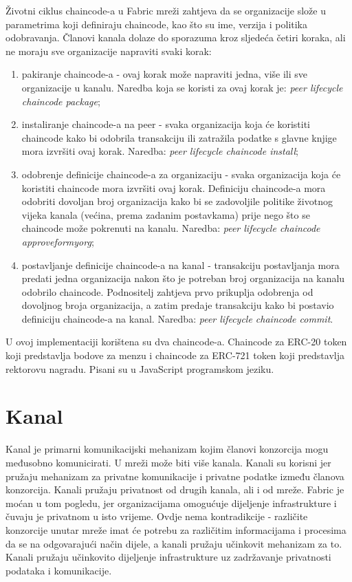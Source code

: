 \documentclass[times, utf8, diplomski]{fer}
\begin{document}
Životni ciklus chaincode-a u Fabric mreži zahtjeva da se organizacije slože u parametrima koji definiraju chaincode, kao što su ime, verzija i politika odobravanja.  Članovi kanala dolaze do sporazuma kroz sljedeća četiri koraka, ali ne moraju sve organizacije napraviti svaki korak:

\begin{enumerate}
\item pakiranje chaincode-a - ovaj korak može napraviti jedna,  više ili sve organizacije u kanalu.  Naredba koja se koristi za ovaj korak je: 
\textit{peer lifecycle chaincode package};

\item instaliranje chaincode-a na peer - svaka organizacija koja će koristiti chaincode kako bi odobrila transakciju ili zatražila podatke s glavne knjige mora izvršiti ovaj korak.  Naredba:
\textit{peer lifecycle chaincode install};

\item odobrenje definicije chaincode-a za organizaciju - svaka organizacija koja će koristiti chaincode mora izvršiti ovaj korak.  Definiciju chaincode-a mora odobriti dovoljan broj organizacija kako bi se zadovoljile politike životnog vijeka kanala (većina,  prema zadanim postavkama) prije nego što se chaincode može pokrenuti na kanalu.  Naredba:
\textit{peer lifecycle chaincode approveformyorg};

\item  postavljanje definicije chaincode-a na kanal - transakciju postavljanja mora predati jedna organizacija nakon što je potreban broj organizacija na kanalu odobrilo chaincode. Podnositelj zahtjeva prvo prikuplja odobrenja od dovoljnog broja organizacija,  a zatim predaje transakciju kako bi postavio definiciju chaincode-a na kanal. Naredba:
\textit{peer lifecycle chaincode commit}.
\end{enumerate}

U ovoj implementaciji korištena su dva chaincode-a. Chaincode za ERC-20 token koji predstavlja bodove za menzu i chaincode za ERC-721 token koji predstavlja rektorovu nagradu. Pisani su u JavaScript programskom jeziku.

\section{Kanal}

Kanal je primarni komunikacijski mehanizam kojim članovi konzorcija mogu međusobno komunicirati. U mreži može biti više kanala. Kanali su korisni jer pružaju mehanizam za privatne komunikacije i privatne podatke između članova konzorcija. Kanali pružaju privatnost od drugih kanala, ali i od mreže. Fabric je moćan u tom pogledu, jer organizacijama omogućuje dijeljenje infrastrukture i čuvaju je privatnom u isto vrijeme. Ovdje nema kontradikcije - različite konzorcije unutar mreže imat će potrebu za različitim informacijama i procesima da se na odgovarajući način dijele, a kanali pružaju učinkovit mehanizam za to. Kanali pružaju učinkovito dijeljenje infrastrukture uz zadržavanje privatnosti podataka i komunikacije. \cite{Fabric}
\end{document}
